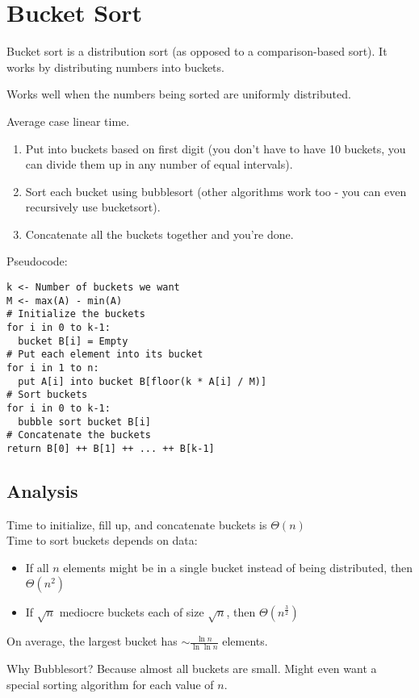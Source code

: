 \section{Bucket Sort}

Bucket sort is a distribution sort (as opposed to a comparison-based sort). It works by distributing numbers into buckets.

Works well when the numbers being sorted are uniformly distributed.

Average case linear time.

\begin{enumerate}
    \item Put into buckets based on first digit (you don't have to have 10 buckets, you can divide them up in any number of equal intervals).
    \item Sort each bucket using bubblesort (other algorithms work too - you can even recursively use bucketsort).
    \item Concatenate all the buckets together and you're done.
\end{enumerate}

Pseudocode:
\begin{verbatim}
k <- Number of buckets we want
M <- max(A) - min(A)
# Initialize the buckets
for i in 0 to k-1:
  bucket B[i] = Empty
# Put each element into its bucket
for i in 1 to n:
  put A[i] into bucket B[floor(k * A[i] / M)]
# Sort buckets
for i in 0 to k-1:
  bubble sort bucket B[i]
# Concatenate the buckets
return B[0] ++ B[1] ++ ... ++ B[k-1]
\end{verbatim}

\subsection*{Analysis}

Time to initialize, fill up, and concatenate buckets is $\Theta(n)$\\
Time to sort buckets depends on data:
\begin{itemize}
    \item If all $n$ elements might be in a single bucket instead of being distributed, then $\Theta(n^2)$
    \item If $\sqrt n$ mediocre buckets each of size $\sqrt n$, then $\displaystyle \Theta(n^\frac 3 2)$
\end{itemize}

On average, the largest bucket has $\displaystyle \sim \frac{\ln n}{\ln \ln n}$ elements.

Why Bubblesort? Because almost all buckets are small. Might even want a special sorting algorithm for each value of $n$.
